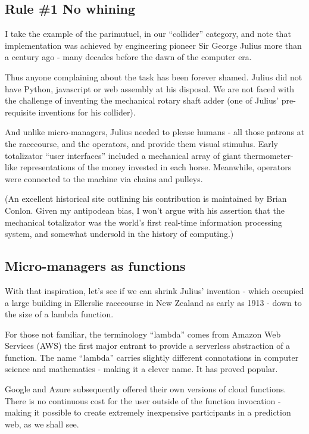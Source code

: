 \subsection{Rule \#1 No whining}

I take the example of the parimutuel, in our ``collider'' category, and note that implementation was achieved by engineering pioneer Sir George Julius more than a century ago - many decades before the dawn of the computer era. 

Thus anyone complaining about the task has been forever shamed. Julius did not have Python, javascript or web assembly at his disposal. We are not faced with the challenge of inventing the mechanical rotary shaft adder (one of Julius' pre-requisite inventions for his collider). 

And unlike micro-managers, Julius needed to please humans - all those patrons at the racecourse, and the operators, and provide them visual stimulus. Early totalizator ``user interfaces'' included a mechanical array of giant thermometer-like representations of the money invested in each horse. Meanwhile, operators were connected to the machine via chains and pulleys.  


(An excellent historical site outlining his contribution is maintained by Brian Conlon. Given my antipodean bias, I won't argue with his assertion that the mechanical totalizator was the world's first real-time information processing system, and somewhat undersold in the history of computing.)


\subsection{Micro-managers as functions}

With that inspiration, let's see if we can shrink Julius' invention - which occupied a large building in Ellerslie racecourse in New Zealand as early as 1913 - down to the size of a lambda function.  

For those not familiar, the terminology ``lambda'' comes from Amazon Web Services (AWS) the first major entrant to provide a serverless abstraction of a function. The name ``lambda'' carries slightly different connotations in computer science and mathematics - making it a clever name. It has proved popular. 

Google and Azure subsequently offered their own versions of cloud functions. There is no continuous cost for the user outside of the function invocation - making it possible to create extremely inexpensive participants in a prediction web, as we shall see.  

